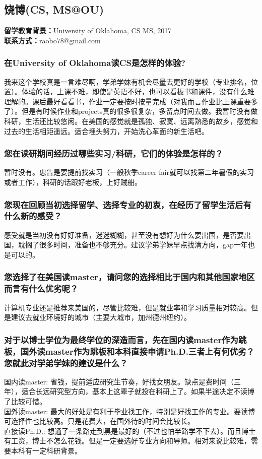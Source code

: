 \documentclass[a4paper,UTF8]{book}
\begin{document}
\clearpage
\subsection{饶博(CS, MS@OU)}
    \textbf{留学教育背景：}University of Oklahoma, CS MS, 2017	\\
    \textbf{联系方式：}raobo78@gmail.com

    \subsubsection*{在University of Oklahoma读CS是怎样的体验?}
    我来这个学校真是一言难尽啊，学弟学妹有机会尽量去更好的学校（专业排名，位置）。体验的话，上课不难，即使是英语不好，也可以看板书和课件，没有什么难理解的。课后最好看看书，作业一定要按时按量完成（对我而言作业比上课重要多了）。但是有时候作业和projects真的很多很复杂，多留点时间去做。我暂时没有做科研，生活还比较悠闲。在美国的感觉就是孤独、寂寞、远离熟悉的故乡，感觉和过去的生活相距遥远。适合埋头努力，开始洗心革面的新生活吧。

    \subsubsection*{您在读研期间经历过哪些实习/科研，它们的体验是怎样的？}
    暂时没有。忠告是要提前找实习（一般秋季career fair就可以找第二年暑假的实习或者工作），科研的话跟好老板，上好贼船。

    \subsubsection*{您现在回顾当初选择留学、选择专业的初衷，在经历了留学生活后有什么新的感受？}
    感受就是当初没有好好准备，迷迷糊糊，甚至没有想好为什么要出国，是否要出国，耽搁了很多时间，准备也不够充分。建议学弟学妹早点找清方向，gap一年也是可以的。

    \subsubsection*{您选择了在美国读master，请问您的选择相比于国内和其他国家地区而言有什么优劣呢？}
    计算机专业还是推荐来美国的，尽管比较难，但是就业率和学习质量相对较高。但是建议去就业环境好的城市（主要大城市，加州德州纽约）。

    \subsubsection*{对于以博士学位为最终学位的深造而言，先在国内读master作为跳板，国外读master作为跳板和本科直接申请Ph.D.三者上有何优劣？您就此对学弟学妹的建议是什么？}
    国内读master: 省钱，提前适应研究生节奏，好找女朋友。缺点是费时间（三年），适合长远研究型方向，基本上这辈子就投在科研上了。如果半途决定不读博了比较可惜。\\
    国外读master: 最大的好处是有利于毕业找工作，特别是好找工作的专业。要读博可选择性也比较高。只是花费大，在国外待的时间会比较长。\\
    直接读Ph.D.: 想通了一条路走到黑是最好的（不过也怕半路学不下去）。而且博士有工资，博士不怎么花钱。但是一定要选好专业方向和导师。相对来说比较难，需要本科有一定科研背景。
\end{document}

